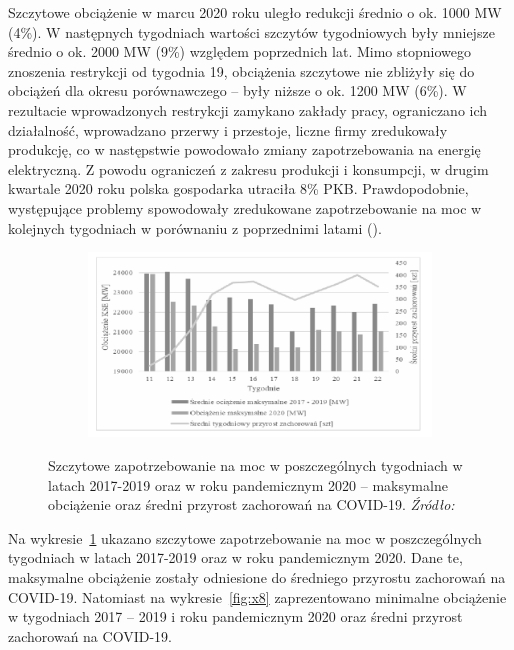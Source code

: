 \documentclass[polish, twoside, 12pt, a4paper]{article}
\theoremstyle{definition}
\theoremstyle{plain}
\theoremstyle{remark}
\begin{document}
Szczytowe obciążenie w marcu 2020 roku uległo redukcji średnio o ok. 1000 MW (4\%). W następnych tygodniach wartości szczytów tygodniowych były mniejsze średnio o ok. 2000 MW (9\%) względem poprzednich lat. Mimo stopniowego znoszenia restrykcji od tygodnia 19, obciążenia szczytowe nie zbliżyły się do obciążeń dla okresu porównawczego – były niższe o ok. 1200 MW (6\%). W rezultacie wprowadzonych restrykcji zamykano zakłady pracy, ograniczano ich działalność, wprowadzano przerwy i przestoje, liczne firmy zredukowały produkcję, co w następstwie powodowało zmiany zapotrzebowania na energię elektryczną. Z powodu ograniczeń z zakresu produkcji i konsumpcji, w drugim kwartale 2020 roku polska gospodarka utraciła 8\% PKB. Prawdopodobnie, występujące problemy spowodowały zredukowane zapotrzebowanie na moc w kolejnych tygodniach w porównaniu z poprzednimi latami (\cite{stahl2021}). 

\begin{figure}[hbt]
  \centering

  \begin{subfigure}[t]{0.45\textwidth}
    \includegraphics[width=\textwidth]{./figure_7}
  \end{subfigure}

  \captionsetup{margin=10pt,font=small,labelfont=bf,width=.8\textwidth}

  \caption[Szczytowe zapotrzebowanie na moc w poszczególnych tygodniach w latach 2017-2019 oraz w roku pandemicznym 2020]{Szczytowe zapotrzebowanie na moc w poszczególnych tygodniach w latach 2017-2019 oraz w roku pandemicznym 2020 – maksymalne obciążenie oraz średni przyrost zachorowań na COVID-19. \textit{Źródło:} \cite{stahl2021}}\label{fig:x7}
\end{figure}

Na wykresie~\ref{fig:x7} ukazano szczytowe zapotrzebowanie na moc w poszczególnych tygodniach w latach 2017-2019 oraz w roku pandemicznym 2020. Dane te, maksymalne obciążenie zostały odniesione do średniego przyrostu zachorowań na COVID-19. Natomiast na wykresie~\ref{fig:x8} zaprezentowano minimalne obciążenie w tygodniach 2017 – 2019 i roku pandemicznym 2020 oraz średni przyrost zachorowań na COVID-19. 
\end{document}
